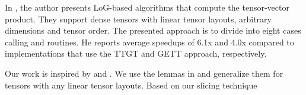 In \cite{bassoy:2019:ttv}, the author presents LoG-based algorithms that compute the tensor-vector product. 
They support dense tensors with linear tensor layouts, arbitrary dimensions and tensor order.
The presented approach is to divide into eight cases calling  and  routines.
He reports average speedups of 6.1x and 4.0x compared to implementations that use the TTGT and GETT approach, respectively.

Our work is inspired by \cite{li:2015:input} and \cite{bassoy:2019:ttv}.
We use the lemmas in \cite{li:2015:input} and generalize them for tensors with any linear tensor layouts. 
Based on our slicing technique
